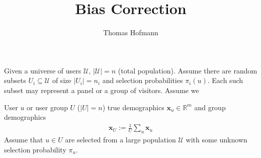\documentclass{article}
\title{Bias Correction}
\author{Thomas Hofmann}
\renewcommand{\Re}{{\mathbb R}}
\newcommand{\x}{{\mathbf x}}
\begin{document}
\maketitle

Given a universe of users $\mathcal U$, $| \mathcal U|=n$ (total population). Assume there are random subsets $U_i \subseteq \mathcal U$ of size $|U_i|=n_i$ and selection probabilities  $\pi_i(u)$. Each such subset may represent a panel or a group of visitors. Assume we 

\newpage


User $u$ or user group $U$ ($|U|=n$) true demographics $\x_u \in \Re^m$ and group demographics
\begin{align}
\x_U := \frac{1}{U}  \sum_u \x_u
\end{align}
Assume that $u\in U$ are selected from a large population $\mathcal U$ with some unknown selection probability $\pi_u$. 
\end{document}
